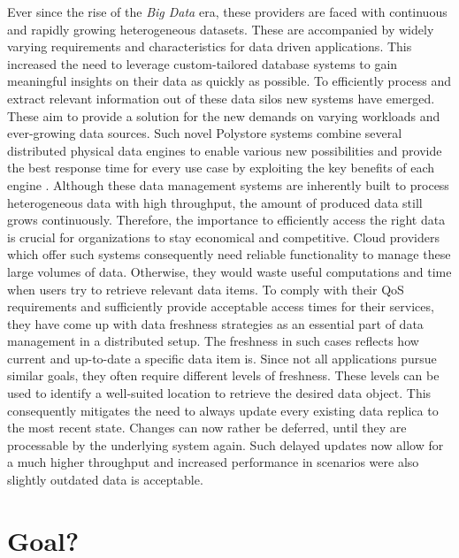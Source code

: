 Ever since the rise of the \emph{Big Data} era, these providers are faced with continuous
and rapidly growing heterogeneous datasets. These are accompanied by widely varying requirements 
and characteristics for data driven applications. This increased the need to leverage custom-tailored 
database systems to gain meaningful insights on their data as quickly as possible.
To efficiently process and extract relevant information out of these data silos new systems
have emerged. These aim to provide a solution for the new demands on varying workloads 
and ever-growing data sources.
Such novel Polystore systems combine several distributed physical data engines to enable various
new possibilities and provide the best response time for every use case by exploiting
the key benefits of each engine \cite{stonebraker:2005} \cite{polypheny2020}. Although these data management systems are inherently
built to process heterogeneous data with high throughput, the amount of produced data
still grows continuously.
Therefore, the importance to efficiently access the right data is crucial
for organizations to stay economical and competitive. Cloud providers which offer such systems consequently 
need reliable functionality to manage these large volumes of data. Otherwise, they would waste useful 
computations and time when users try to retrieve relevant data items\cite{levandowski2013}.
To comply with their QoS requirements and sufficiently provide acceptable access times for their services, 
they have come up with data freshness strategies as an essential part of data management in a
distributed setup. 
The freshness in such cases reflects how current and up-to-date a specific data item is.
Since not all applications pursue similar goals, they often require different levels of freshness.
These levels can be used to identify a well-suited location to retrieve the desired data object. 
This consequently mitigates the need to always update every existing data replica to the most recent state.
Changes can now rather be deferred, until they are processable by the underlying system again.
Such delayed updates now allow for a much higher throughput and increased performance in scenarios were also slightly 
outdated data is acceptable.



\section{Goal?}


